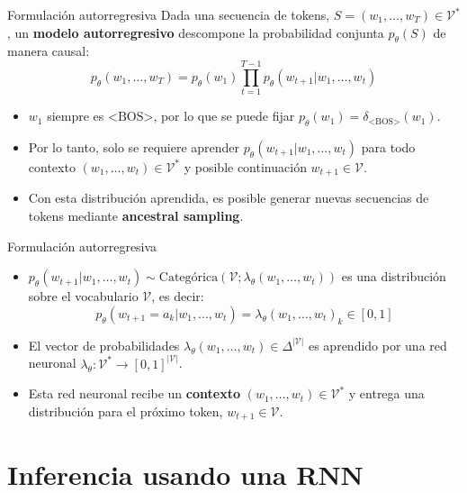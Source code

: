 \documentclass{beamer}
\begin{document}
\begin{frame}{Formulación autorregresiva}
    Dada una secuencia de tokens, $S=(w_1,\ldots,w_T)\in\mathcal{V}^*$, un \textbf{modelo autorregresivo} descompone la probabilidad conjunta $p_\theta(S)$ de manera causal:
    \begin{equation*}
        p_\theta(w_1,\ldots,w_T)=p_\theta(w_1)\prod_{t=1}^{T-1} p_\theta(w_{t+1}|w_1,\ldots,w_t)
    \end{equation*}
    \begin{itemize}
        \item $w_1$ siempre es $\text{<BOS>}$, por lo que se puede fijar $p_\theta(w_1)=\delta_{\text{<BOS>}}(w_1)$.
        \item Por lo tanto, solo se requiere aprender $p_\theta(w_{t+1}|w_1,\ldots,w_t)$ para todo contexto $(w_1,\ldots, w_t)\in\mathcal{V}^*$ y posible continuación $w_{t+1}\in\mathcal{V}$.
        \item Con esta distribución aprendida, es posible generar nuevas secuencias de tokens mediante \textbf{ancestral sampling}.
    \end{itemize}
\end{frame}

\begin{frame}{Formulación autorregresiva}
    \begin{itemize}
        \item $p_\theta(w_{t+1}|w_1,\ldots,w_t)\sim\text{Categórica}\left(\mathcal{V};\lambda_\theta(w_1,\ldots,w_t)\right)$ es una distribución sobre el vocabulario $\mathcal{V}$, es decir:
              \begin{equation*}
                  p_\theta(w_{t+1}=a_k|w_1,\ldots,w_t)=\lambda_\theta(w_1,\ldots,w_t)_k\in[0,1]
              \end{equation*}
        \item El vector de probabilidades $\lambda_\theta(w_1,\ldots,w_t)\in\Delta^{|\mathcal{V}|}$ es aprendido por una red neuronal $\lambda_\theta:\mathcal{V}^*\to[0,1]^{|\mathcal{V}|}$.
        \item Esta red neuronal recibe un \textbf{contexto} $(w_1,\ldots,w_t)\in\mathcal{V}^*$ y entrega una distribución para el próximo token, $w_{t+1}\in\mathcal{V}$.
    \end{itemize}
\end{frame}

\section{Inferencia usando una RNN}
\end{document}

